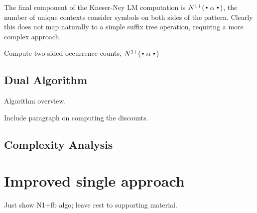 The final component of the Kneser-Ney LM computation is
$\nlplus{\dotpatdot}$, the number of unique contexts consider symbols
on both sides of the pattern. 
Clearly this does not map naturally to a simple suffix tree operation,
requiring a more complex approach.



\begin{algorithm*}
  \caption{Compute two-sided occurrence counts, $\nlplus{\dotpatdot}$ 
    \label{alg:n1plusfb}}
  \begin{algorithmic}[1]
           
           
        \Else
           \For{$\chf \gets \children{\tf}{\nf}$} 
               
               
              \Statex    {}
            \EndFor
        \EndIf
      \State {}
    \EndFunction
  \end{algorithmic}
\end{algorithm*}




\subsection{Dual \CST Algorithm} 

Algorithm overview.

Include paragraph on computing the discounts.

\subsection{Complexity Analysis}

\section{Improved single \CST approach}

Just show N1+fb algo; leave rest to supporting material.

